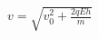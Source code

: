 \documentclass[preview]{standalone}
\begin{document}
\begin{align*}
v = \sqrt{v_0^2 + \frac{2qEh}{m}}
\end{align*}
\end{document}
